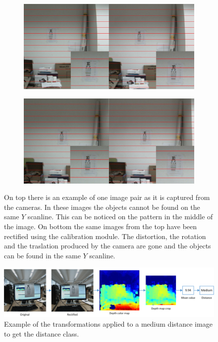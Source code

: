 \documentclass[10pt,a4paper,twocolumn,twoside]{article}
\begin{document}
	\begin{figure}
		\centering
		\begin{subfigure}[t]{0.5\textwidth}
			\centering
			\includegraphics[width=\linewidth]{img/regular2z.png}
			\label{fig:rec:regular}
		\end{subfigure}%
	\vspace{1cm}
		\begin{subfigure}[t]{0.5\textwidth}
			\centering
			\includegraphics[width=\linewidth]{img/rectified2z.png}
			\label{fig:rec:ractified}
		\end{subfigure}
		\caption{On top there is an example of one image pair as it is captured from the cameras. In these images the objects cannot be found on the same $Y$ scanline. This can be noticed on the pattern in the middle of the image. On bottom the same images from the top have been rectified using the calibration module. The distortion, the rotation and the traslation produced by the camera are gone and the objects can be found in the same $Y$ scanline. }
		\label{fig:rec}
	\end{figure}

	\begin{figure}
		\centering
		\includegraphics[width=1\linewidth]{img/pipelineMediumSimple.png}
		\caption{Example of the transformations applied to a medium distance image to get the distance class.}
		\label{fig:add:pattern}
	\end{figure}
\end{document}
